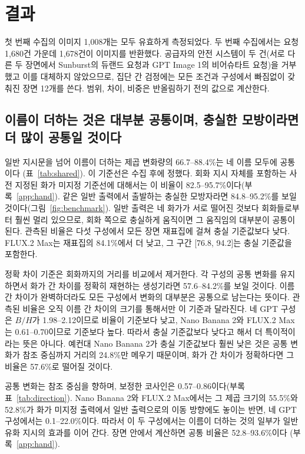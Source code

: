 \documentclass[10pt]{article}
\begin{document}
\section{결과}\label{sec:results}

첫 번째 수집의 이미지 1,008개는 모두 유효하게 측정되었다. 두 번째 수집에서는 요청 1,680건 가운데
1,678건이 이미지를 반환했다. 공급자의 안전 시스템이 두 건(서로 다른 두 장면에서 Sunburst의 듀랜드 요청과
GPT Image 1의 비어슈타트 요청)을 거부했고 이를 대체하지 않았으므로, 집단 간 검정에는 모든 조건과 구성에서
빠짐없이 갖춰진 장면 12개를 쓴다. 범위, 차이, 비중은 반올림하기 전의 값으로 계산한다.

\subsection{이름이 더하는 것은 대부분 공통이며, 충실한 모방이라면 더 많이 공통일 것이다}\label{sec:shared}



일반 지시문을 넘어 이름이 더하는 제곱 변화량의 66.7--88.4\%는 네 이름 모두에 공통이다
(표~\ref{tab:shared}). 이 기준선은 수집 후에 정했다. 회화 지시 자체를 포함하는 사전 지정된 화가 미지정
기준선에 대해서는 이 비율이 82.5--95.7\%이다(부록~\ref{app:hand}). 같은 일반 출력에서 출발하는 충실한
모방자라면 84.8--95.2\%를 보일 것이다(그림~\ref{fig:benchmark}). 일반 출력은 네 화가가 서로 떨어진
것보다 회화들로부터 훨씬 멀리 있으므로, 회화 쪽으로 충실하게 움직이면 그 움직임의 대부분이 공통이 된다.
관측된 비율은 다섯 구성에서 모든 장면 재표집에 걸쳐 충실 기준값보다 낮다. FLUX.2 Max는 재표집의
84.1\%에서 더 낮고, 그 구간 [76.8, 94.2]는 충실 기준값을 포함한다.

정확 차이 기준은 회화까지의 거리를 비교에서 제거한다. 각 구성의 공통 변화를 유지하면서 화가 간 차이를
정확히 재현하는 생성기라면 57.6--84.2\%를 보일 것이다. 이름 간 차이가 완벽하더라도 모든 구성에서 변화의
대부분은 공통으로 남는다는 뜻이다. 관측된 비율은 오직 이름 간 차이의 크기를 통해서만 이 기준과 달라진다.
네 GPT 구성은 $B/H$가 1.98--2.12이므로 비율이 기준보다 낮고, Nano Banana 2와 FLUX.2 Max는
0.61--0.70이므로 기준보다 높다. 따라서 충실 기준값보다 낮다고 해서 더 특이적이라는 뜻은 아니다. 예컨대
Nano Banana 2가 충실 기준값보다 훨씬 낮은 것은 공통 변화가 참조 중심까지 거리의 24.8\%만 메우기
때문이며, 화가 간 차이가 정확하다면 그 비율은 57.6\%로 떨어질 것이다.

공통 변화는 참조 중심을 향하며, 보정한 코사인은 0.57--0.86이다(부록 표~\ref{tab:direction}).
Nano Banana 2와 FLUX.2 Max에서는 그 제곱 크기의 55.5\%와 52.8\%가 화가 미지정 출력에서 일반 출력으로의
이동 방향에도 놓이는 반면, 네 GPT 구성에서는 0.1--22.0\%이다. 따라서 이 두 구성에서는 이름이 더하는 것의
일부가 일반 유화 지시의 효과를 이어 간다. 장면 안에서 계산하면 공통 비율은 52.8--93.6\%이다
(부록~\ref{app:hand}).
\end{document}
